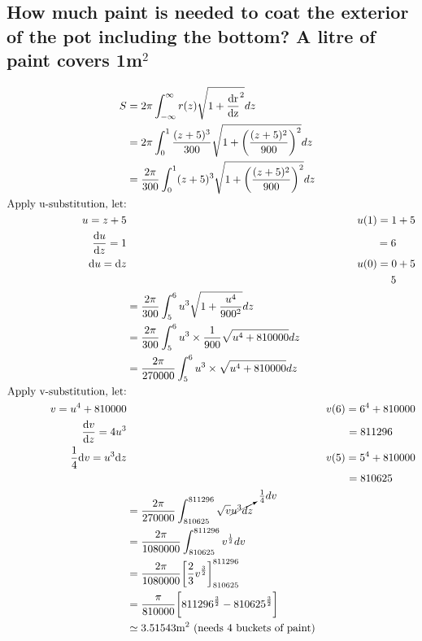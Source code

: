 \documentclass{article}
\begin{document}
    \subsection*{How much paint is needed to coat the exterior of the pot including the bottom? A litre of paint covers 1m$^{2}$}
    \begin{align*}
        S &= 2\pi\int^{\infty}_{-\infty}r(z)\sqrt{1+\frac{\text{dr}}{\text{dz}}^{2}} dz\\
        &= 2\pi \int^{1}_{0} \frac{(z+5)^3}{300}\sqrt{1+\bigg(\frac{(z+5)^2}{900}\bigg)^2} dz\\
        &= \frac{2\pi}{300} \int^{1}_{0} (z+5)^{3}\sqrt{1+\bigg(\frac{(z+5)^2}{900}\bigg)^2} dz\\
        \text{Apply u-substitution, let:}\\
        u = z+5 && u(1) = 1+5\\
        \odv{u}{z} = 1 && = 6\phantom{34-}\\
        \text{d}u = \text{d}z && u(0) = 0+5\\
        && 5\phantom{34-}\\
        &= \frac{2\pi}{300} \int^{6}_{5} u^{3}\sqrt{1+\frac{u^4}{900^{2}}} dz\\
        &= \frac{2\pi}{300} \int^{6}_{5} u^{3}\times\frac{1}{900}\sqrt{u^4+810000}dz\\
        &= \frac{2\pi}{270000} \int^{6}_{5} u^{3}\times\sqrt{u^4+810000}dz\\
        \text{Apply v-substitution, let:}\\
        v = u^{4}+810000 && v(6) = 6^4+810000\\
        \odv{v}{z} = 4u^{3} && = 811296\phantom{fw-}\\
        \frac{1}{4}\text{d}v =  u^{3}\text{d}z && v(5) = 5^4+810000\\
        && = 810625\phantom{fw-}\\
        &= \frac{2\pi}{270000} \int^{811296}_{810625} \sqrt{v}\cancelto{\frac{1}{4}dv}{u^{3}dz}\\
        &= \frac{2\pi}{1080000} \int^{811296}_{810625} v^{\frac{1}{2}} dv\\
        &= \frac{2\pi}{1080000} \bigg[\frac{2}{3}v^{\frac{3}{2}}\bigg]^{811296}_{810625}\\
        &= \frac{\pi }{810000}\bigg[811296^{\frac{3}{2}}-810625^{\frac{3}{2}}\bigg]\\
        &\simeq 3.51543\text{m}^{2} \text{ (needs 4 buckets of paint)}
\end{align*}
\end{document}
